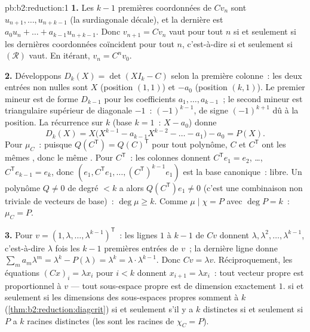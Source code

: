 \begin{solution}{pb:b2:reduction:1}
\textbf{1.} Les $k - 1$ premières coordonnées de $Cv_n$ sont
$u_{n+1}, \dots, u_{n+k-1}$ (la surdiagonale décale), et la dernière
est $a_0 u_n + \dots + a_{k-1}u_{n+k-1}$. Donc $v_{n+1} = Cv_n$ vaut
pour tout $n$ si et seulement si les dernières coordonnées coïncident
pour tout $n$, c'est-à-dire si et seulement si $(\mathcal R)$ vaut. En
itérant, $v_n = C^nv_0$.

\textbf{2.} Développons $D_k(X) = \det(XI_k - C)$ selon la première
colonne~: les deux entrées non nulles sont $X$ (position $(1,1)$) et
$-a_0$ (position $(k,1)$). Le premier mineur est de forme $D_{k-1}$
pour les coefficients $a_1, \dots, a_{k-1}$~; le second mineur est
triangulaire supérieur de diagonale $-1$~:  $(-1)^{k-1}$,
de signe $(-1)^{k+1}$ dû à la position. La récurrence sur $k$ (base
$k = 1$~: $X - a_0$) donne
\[
D_k(X) = X\bigl(X^{k-1} - a_{k-1}X^{k-2} - \dots - a_1\bigr) -
a_0 = P(X).
\]
Pour $\mu_C$~: puisque $Q(C^{\mathsf T}) = Q(C)^{\mathsf T}$ pour tout
polynôme, $C$ et $C^{\mathsf T}$ ont les mêmes , donc le
même . Pour $C^{\mathsf T}$~: les colonnes donnent
$C^{\mathsf T}e_1 = e_2$, \dots, $C^{\mathsf T}e_{k-1} = e_k$, donc
$(e_1, C^{\mathsf T}e_1, \dots, (C^{\mathsf T})^{k-1}e_1)$ est la base
canonique~: libre. Un polynôme $Q \neq 0$ de degré $< k$ a alors
$Q(C^{\mathsf T})e_1 \neq 0$ (c'est une combinaison non triviale de
vecteurs de base)~: $\deg\mu \geq k$. Comme $\mu \mid \chi = P$ avec
$\deg P = k$~: $\mu_C = P$.

\textbf{3.} Pour $v = (1, \lambda, \dots, \lambda^{k-1})^{\mathsf
T}$~: les lignes $1$ à $k-1$ de $Cv$ donnent $\lambda, \lambda^2,
\dots, \lambda^{k-1}$, c'est-à-dire $\lambda$ fois les $k - 1$
premières entrées de $v$~; la dernière ligne donne $\sum_m
a_m\lambda^m = \lambda^k - P(\lambda) = \lambda^k =
\lambda\cdot\lambda^{k-1}$. Donc $Cv = \lambda v$. Réciproquement, les
équations $(Cx)_i = \lambda x_i$ pour $i < k$ donnent $x_{i+1} =
\lambda x_i$~: tout vecteur propre est proportionnel à $v$ --- tout
sous-espace propre est de dimension exactement $1$.  si
et seulement si les dimensions des sous-espaces propres somment à $k$
(\cref{thm:b2:reduction:diagcrit}) si et seulement s'il y a $k$
 distinctes si et seulement si $P$ a $k$ racines
distinctes (les  sont les racines de $\chi_C = P$).


\end{solution}
